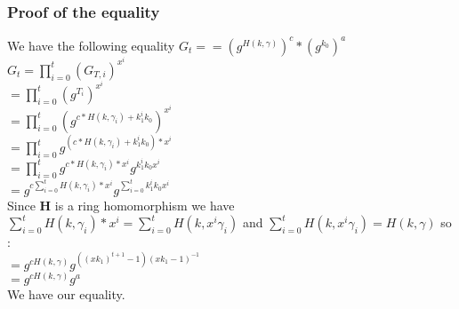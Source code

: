 \subsubsection{Proof of the equality}
We have the following equality $G_t  == (g^{H(k, \gamma)})^c * (g^{k_0})^a$ \\
$G_t = \prod_{i=0}^t (G_{T,i})^{x^i}$ \\
$= \prod_{i=0}^t (g^{T_i})^{x^i}$ \\
$= \prod_{i=0}^t (g^{c*H(k, \gamma_i) + k_1^i k_0})^{x^i}$ \\
$= \prod_{i=0}^t g^{(c*H(k, \gamma_i) + k_1^i k_0) * x^i}$ \\
$= \prod_{i=0}^t g^{c*H(k, \gamma_i) * x^i} g^{ k_1^i k_0 x^i}$ \\
$= g^{c\sum_{i=0}^t H(k, \gamma_i) * x^i} g^{\sum_{i=0}^t k_1^i k_0 x^i}$ \\ 
Since \textbf{H} is a ring homomorphism we have $\sum_{i=0}^t H(k, \gamma_i) * x^i = \sum_{i=0}^t H(k, x^i \gamma_i)$ and $\sum_{i=0}^t H(k, x^i \gamma_i) = H(k, \gamma)$ so :\\
$= g^{c  H(k, \gamma)} g^{((x  k_1)^{t+1}-1)(x k_1 - 1)^{-1}}$ \\
$= g^{c  H(k, \gamma)} g^a$ \\
We have our equality.
